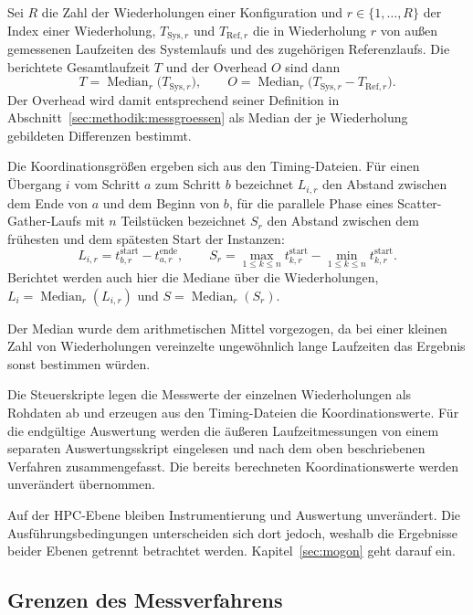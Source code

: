 Sei $R$ die Zahl der Wiederholungen einer Konfiguration und
$r \in \{1,\ldots,R\}$ der Index einer Wiederholung,
$T_{\mathrm{Sys},r}$ und $T_{\mathrm{Ref},r}$ die in Wiederholung
$r$ von außen gemessenen Laufzeiten des Systemlaufs und des
zugehörigen Referenzlaufs. Die berichtete Gesamtlaufzeit $T$ und
der Overhead $O$ sind dann
\[
  T = \operatorname{Median}_{r}\bigl(T_{\mathrm{Sys},r}\bigr),
  \qquad
  O = \operatorname{Median}_{r}\bigl(T_{\mathrm{Sys},r}
      - T_{\mathrm{Ref},r}\bigr).
\]
Der Overhead wird damit entsprechend seiner Definition in
Abschnitt~\ref{sec:methodik:messgroessen} als Median der je
Wiederholung gebildeten Differenzen bestimmt.

Die Koordinationsgrößen ergeben sich aus den Timing-Dateien. Für
einen Übergang $i$ vom Schritt $a$ zum Schritt $b$ bezeichnet
$L_{i,r}$ den Abstand zwischen dem Ende von $a$ und dem Beginn von
$b$, für die parallele Phase eines Scatter-Gather-Laufs mit $n$
Teilstücken bezeichnet $S_r$ den Abstand zwischen dem frühesten und
dem spätesten Start der Instanzen:
\[
  L_{i,r} = t^{\text{start}}_{b,r} - t^{\text{ende}}_{a,r},
  \qquad
  S_r = \max_{1 \le k \le n} t^{\text{start}}_{k,r}
      - \min_{1 \le k \le n} t^{\text{start}}_{k,r}.
\]
Berichtet werden auch hier die Mediane über die Wiederholungen,
$L_i = \operatorname{Median}_{r}(L_{i,r})$ und
$S = \operatorname{Median}_{r}(S_r)$.

Der Median wurde dem arithmetischen Mittel vorgezogen, da bei einer
kleinen Zahl von Wiederholungen vereinzelte ungewöhnlich lange
Laufzeiten das Ergebnis sonst bestimmen würden.

Die Steuerskripte legen die Messwerte der einzelnen Wiederholungen
als Rohdaten ab und erzeugen aus den Timing-Dateien die
Koordinationswerte. Für die endgültige Auswertung werden die
äußeren Laufzeitmessungen von einem separaten Auswertungsskript
eingelesen und nach dem oben beschriebenen Verfahren
zusammengefasst. Die bereits berechneten Koordinationswerte werden
unverändert übernommen.

Auf der HPC-Ebene bleiben Instrumentierung und Auswertung
unverändert. Die Ausführungsbedingungen unterscheiden sich dort
jedoch, weshalb die Ergebnisse beider Ebenen getrennt betrachtet
werden. Kapitel~\ref{sec:mogon} geht darauf ein.

\subsection{Grenzen des Messverfahrens}
\label{sec:methodik:grenzen}

